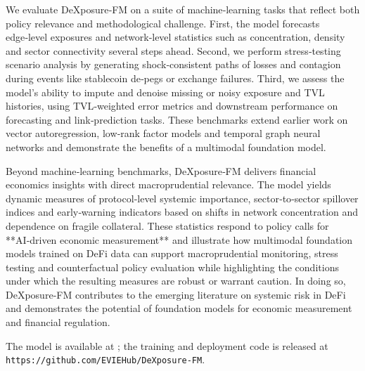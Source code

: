 We evaluate DeXposure‑FM on a suite of machine‑learning tasks that reflect both policy relevance and methodological challenge.  First, the model forecasts edge‑level exposures and network‑level statistics such as concentration, density and sector connectivity several steps ahead.  Second, we perform stress‑testing scenario analysis by generating shock‑consistent paths of losses and contagion during events like stablecoin de‑pegs or exchange failures.  Third, we assess the model’s ability to impute and denoise missing or noisy exposure and TVL histories, using TVL‑weighted error metrics and downstream performance on forecasting and link‑prediction tasks.  These benchmarks extend earlier work on vector autoregression, low‑rank factor models and temporal graph neural networks and demonstrate the benefits of a multimodal foundation model.

Beyond machine‑learning benchmarks, DeXposure‑FM delivers financial economics insights with direct macroprudential relevance.  The model yields dynamic measures of protocol‑level systemic importance, sector‑to‑sector spillover indices and early‑warning indicators based on shifts in network concentration and dependence on fragile collateral.  These statistics respond to policy calls for **AI‑driven economic measurement**   \cite{nber2025ai} and illustrate how multimodal foundation models trained on DeFi data can support macroprudential monitoring, stress testing and counterfactual policy evaluation while highlighting the conditions under which the resulting measures are robust or warrant caution.  In doing so, DeXposure‑FM contributes to the emerging literature on systemic risk in DeFi  \cite{naifar2025mapping,zbandut2025institutionalizing} and demonstrates the potential of foundation models for economic measurement and financial regulation.

The model is available at ; the training and deployment code is released at \texttt{https://github.com/EVIEHub/DeXposure-FM}.